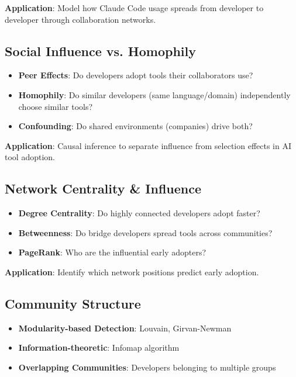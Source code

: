 \documentclass[11pt,letterpaper]{article}
\begin{document}
\textbf{Application}: Model how Claude Code usage spreads from developer to developer through collaboration networks.

\subsection{Social Influence vs. Homophily}

\begin{itemize}
    \item \textbf{Peer Effects}: Do developers adopt tools their collaborators use?
    \item \textbf{Homophily}: Do similar developers (same language/domain) independently choose similar tools?
    \item \textbf{Confounding}: Do shared environments (companies) drive both?
\end{itemize}

\textbf{Application}: Causal inference to separate influence from selection effects in AI tool adoption.

\subsection{Network Centrality \& Influence}

\begin{itemize}
    \item \textbf{Degree Centrality}: Do highly connected developers adopt faster?
    \item \textbf{Betweenness}: Do bridge developers spread tools across communities?
    \item \textbf{PageRank}: Who are the influential early adopters?
\end{itemize}

\textbf{Application}: Identify which network positions predict early adoption.

\subsection{Community Structure}

\begin{itemize}
    \item \textbf{Modularity-based Detection}: Louvain, Girvan-Newman
    \item \textbf{Information-theoretic}: Infomap algorithm
    \item \textbf{Overlapping Communities}: Developers belonging to multiple groups
\end{itemize}
\end{document}
